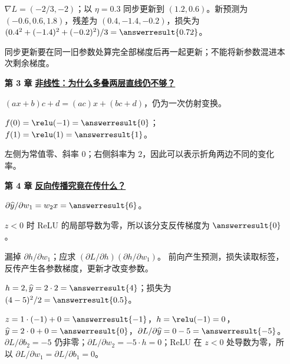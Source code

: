 \begin{enumerate}[leftmargin=5.4em,labelsep=.7em,itemsep=9pt]
\par{}$\nabla L=(-2/3,-2)$；以 $\eta=0.3$ 同步更新到 $(1.2,0.6)$。新预测为 $(-0.6,0.6,1.8)$，残差为 $(0.4,-1.4,-0.2)$，损失为 $(0.4^2+(-1.4)^2+(-0.2)^2)/3=\answerresult{0.72}$。
\par{}同步更新要在同一旧参数处算完全部梯度后再一起更新；不能将新参数混进本次剩余梯度。
\par{}
\item[\textbf{第 3 章}] \label{answer:07-functions-relu}\textbf{\hyperref[check:07-functions-relu]{非线性：为什么多叠两层直线仍不够？}}\par\nobreak
{}$(ax+b)c+d=(ac)x+(bc+d)$，仍为一次仿射变换。
\par{}$f(0)=\relu(-1)=\answerresult{0}$；$f(1)=\relu(1)=\answerresult{1}$。
\par{}左侧为常值零、斜率 $0$；右侧斜率为 $2$，因此可以表示折角两边不同的变化率。
\par{}
\item[\textbf{第 4 章}] \label{answer:17-backpropagation}\textbf{\hyperref[check:17-backpropagation]{反向传播究竟在传什么？}}\par\nobreak
{}$\partial\widehat{y}/\partial w_1=w_2x=\answerresult{6}$。
\par{}$z<0$ 时 ReLU 的局部导数为零，所以该分支反传梯度为 $\answerresult{0}$。
\par{}漏掉 $\partial h/\partial w_1$；应求 $(\partial L/\partial h)(\partial h/\partial w_1)$。
前向产生预测，损失读取标签，反传产生各参数梯度，更新才改变参数。
\par{}$h=2,\widehat{y}=2\cdot2=\answerresult{4}$；损失为 $(4-5)^2/2=\answerresult{0.5}$。
\par{}$z=1\cdot(-1)+0=\answerresult{-1}$，$h=\relu(-1)=0$，$\widehat{y}=2\cdot0+0=\answerresult{0}$，$\partial L/\partial\widehat{y}=0-5=\answerresult{-5}$。$\partial L/\partial b_2=-5$ 仍非零；$\partial L/\partial w_2=-5\cdot h=0$；ReLU 在 $z<0$ 处导数为零，所以 $\partial L/\partial w_1=\partial L/\partial b_1=0$。

\end{enumerate}
